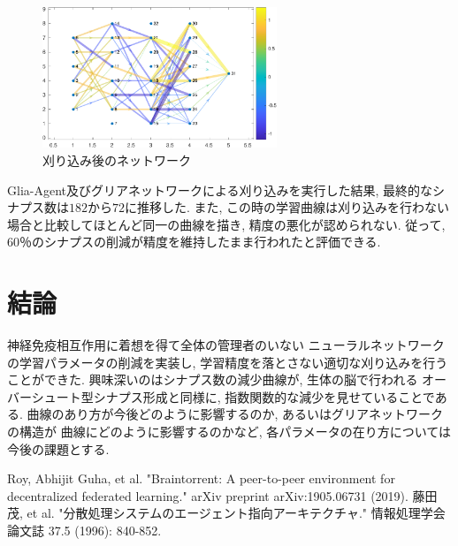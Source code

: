 \documentclass[a4paper, 9pt,twocolumn,dvipdfmx]{jsarticle}
\begin{document}
\vspace{-2zh}
\begin{figure}[H]
  \centering
  \includegraphics[width=7cm]{Graph-crop.pdf} 
  \caption{刈り込み後のネットワーク}
  \label{fig:Graph}
\end{figure}
Glia-Agent及びグリアネットワークによる刈り込みを実行した結果, 最終的なシナプス数は$182$から$72$に推移した. 
また, この時の学習曲線は刈り込みを行わない場合と比較してほとんど同一の曲線を描き, 
精度の悪化が認められない.
従って, 60％のシナプスの削減が精度を維持したまま行われたと評価できる.
\section{結論}
神経免疫相互作用に着想を得て全体の管理者のいない
ニューラルネットワークの学習パラメータの削減を実装し, 
学習精度を落とさない適切な刈り込みを行うことができた.
興味深いのはシナプス数の減少曲線が, 生体の脳で行われる
オーバーシュート型シナプス形成と同様に, 
指数関数的な減少を見せていることである. 
曲線のあり方が今後どのように影響するのか, 
あるいはグリアネットワークの構造が
曲線にどのように影響するのかなど, 
各パラメータの在り方については今後の課題とする.
 \begin{thebibliography}{99}
  Roy, Abhijit Guha, et al. "Braintorrent: A peer-to-peer environment for decentralized federated learning." arXiv preprint arXiv:1905.06731 (2019).
  藤田茂, et al. "分散処理システムのエージェント指向アーキテクチャ." 情報処理学会論文誌 37.5 (1996): 840-852.
\end{thebibliography}
 
\end{document}
